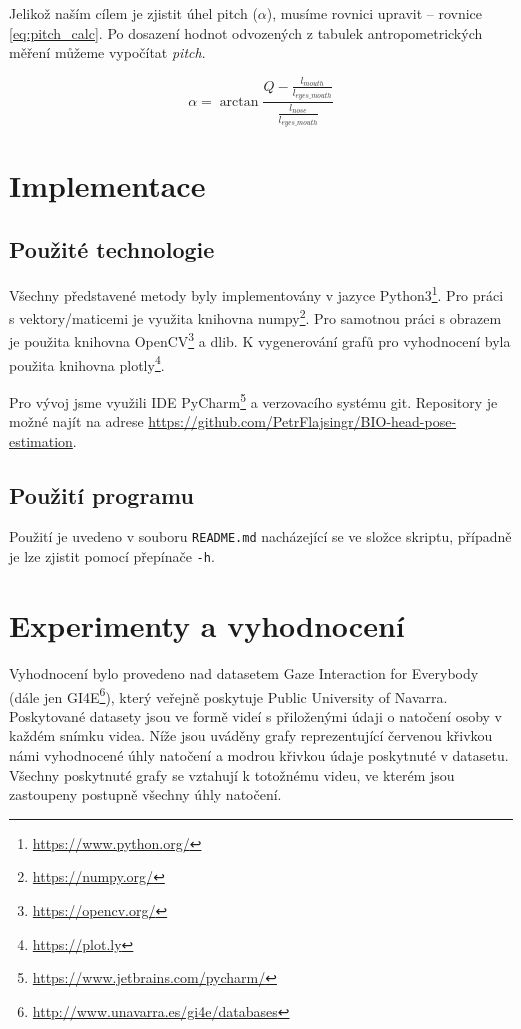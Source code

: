 \documentclass[12pt,a4paper,titlepage,final]{report}
\begin{document}
Jelikož naším cílem je zjistit úhel pitch ($\alpha$), musíme rovnici upravit -- rovnice \ref{eq:pitch_calc}. Po dosazení hodnot odvozených z tabulek antropometrických měření můžeme vypočítat \textit{pitch}.

\begin{equation}\label{eq:pitch_calc}
\alpha = \arctan{\frac{Q - \frac{l_{mouth}}{l_{eyes\_mouth}}}{\frac{l_{nose}}{l_{eyes\_mouth}}}}
\end{equation}

\section{Implementace}
\subsection{Použité technologie}
Všechny představené metody byly implementovány v jazyce Python3\footnote{\url{https://www.python.org/}}. Pro práci s vektory/maticemi je využita knihovna numpy\footnote{\url{https://numpy.org/}}. Pro samotnou práci s obrazem je použita knihovna OpenCV\footnote{\url{https://opencv.org/}} a dlib. K vygenerování grafů pro vyhodnocení byla použita knihovna plotly\footnote{\url{https://plot.ly}}.

Pro vývoj jsme využili IDE PyCharm\footnote{\url{https://www.jetbrains.com/pycharm/}} a verzovacího systému git. Repository je možné najít na adrese \url{https://github.com/PetrFlajsingr/BIO-head-pose-estimation}.
\subsection{Použití programu}
Použití je uvedeno v souboru \texttt{README.md} nacházející se ve složce skriptu, případně je lze zjistit pomocí přepínače \texttt{-h}.

\section{Experimenty a vyhodnocení}
Vyhodnocení bylo provedeno nad datasetem Gaze Interaction for Everybody (dále jen GI4E\footnote{\url{http://www.unavarra.es/gi4e/databases}}), který veřejně poskytuje Public University of Navarra. Poskytované datasety jsou ve formě videí s přiloženými údaji o natočení osoby v každém snímku videa. Níže jsou uváděny grafy reprezentující červenou křivkou námi vyhodnocené úhly natočení a modrou křivkou údaje poskytnuté v datasetu. Všechny poskytnuté grafy se vztahují k totožnému videu, ve kterém jsou zastoupeny postupně všechny úhly natočení.
\end{document}

